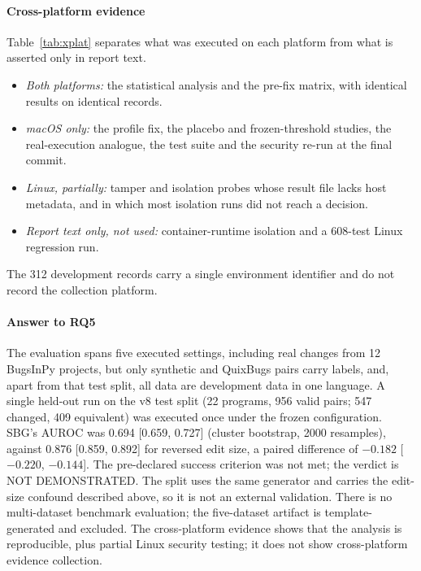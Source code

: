 \paragraph*{Cross-platform evidence} Table~\ref{tab:xplat} separates what was executed on each platform from what is asserted only in report text.
\begin{itemize}
\item \emph{Both platforms:} the statistical analysis and the pre-fix \ers{} matrix, with identical results on identical records.
\item \emph{macOS only:} the profile fix, the placebo and frozen-threshold studies, the real-execution \ers{} analogue, the test suite and the security re-run at the final commit.
\item \emph{Linux, partially:} tamper and isolation probes whose result file lacks host metadata, and in which most isolation runs did not reach a decision.
\item \emph{Report text only, not used:} container-runtime isolation and a 608-test Linux regression run.
\end{itemize}
The 312 development records carry a single environment identifier and do not record the collection platform.

\paragraph*{Answer to RQ5} The evaluation spans five executed settings, including real changes from 12 BugsInPy projects, but only synthetic and QuixBugs pairs carry labels, and, apart from that test split, all data are development data in one language. A single held-out run on the v8 test split (22 programs, 956 valid pairs; 547 changed, 409 equivalent) was executed once under the frozen configuration. SBG's AUROC was 0.694 [0.659, 0.727] (cluster bootstrap, 2000 resamples), against 0.876 [0.859, 0.892] for reversed edit size, a paired difference of $-0.182$ [$-0.220$, $-0.144$]. The pre-declared success criterion was not met; the verdict is NOT DEMONSTRATED. The split uses the same generator and carries the edit-size confound described above, so it is not an external validation. There is no multi-dataset benchmark evaluation; the five-dataset artifact is template-generated and excluded. The cross-platform evidence shows that the analysis is reproducible, plus partial Linux security testing; it does not show cross-platform evidence collection.


